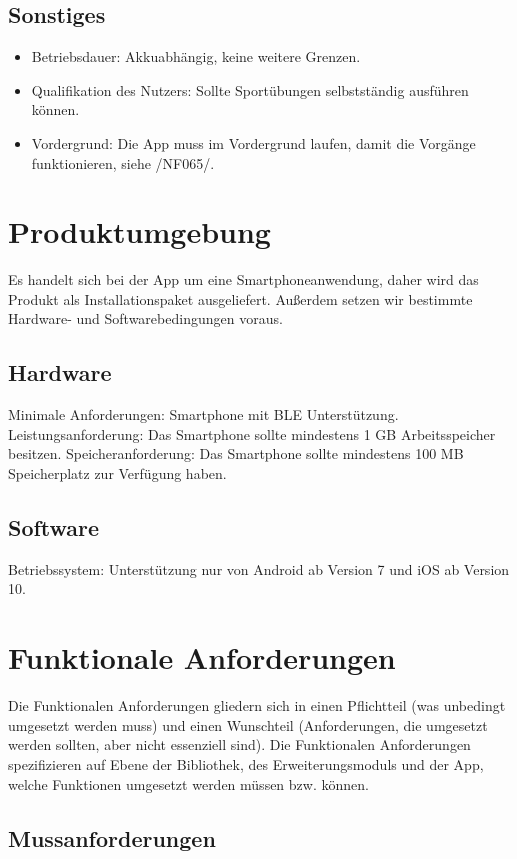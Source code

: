 \documentclass[a4paper,12pt]{article}
\begin{document}
    \subsection{Sonstiges}
    \begin{itemize}
      \item \textsf{Betriebsdauer:} \glqq Akkuabhängig\grqq, keine weitere Grenzen.
      \item \textsf{Qualifikation des Nutzers:} Sollte Sportübungen selbstständig ausführen können.
      \item \textsf{Vordergrund:} Die App muss im Vordergrund laufen, damit die Vorgänge funktionieren, siehe /NF065/.
    \end{itemize}
      
\section{Produktumgebung}
Es handelt sich bei der App um eine Smartphoneanwendung, daher wird das Produkt als Installationspaket ausgeliefert. Außerdem setzen wir bestimmte Hardware- und Softwarebedingungen voraus.
\subsection{Hardware} 
	\textsf{Minimale Anforderungen:} Smartphone mit \Gls{BLE} Unterstützung. %
	\textsf{Leistungsanforderung:} Das Smartphone sollte mindestens 1 GB Arbeitsspeicher besitzen.
	\textsf{Speicheranforderung:} Das Smartphone sollte mindestens 100 MB Speicherplatz zur Verfügung haben.
\subsection{Software} 
	\textsf{Betriebssystem:} Unterstützung nur von Android ab Version 7 und iOS ab Version 10.


\section{Funktionale Anforderungen}
Die Funktionalen Anforderungen gliedern sich in einen Pflichtteil (was unbedingt umgesetzt werden muss) und einen Wunschteil (Anforderungen, die umgesetzt werden sollten, aber nicht essenziell sind). Die Funktionalen Anforderungen spezifizieren auf Ebene der Bibliothek, des Erweiterungsmoduls und der App, welche Funktionen umgesetzt werden müssen bzw. können. 
  \subsection{Mussanforderungen}
\end{document}
